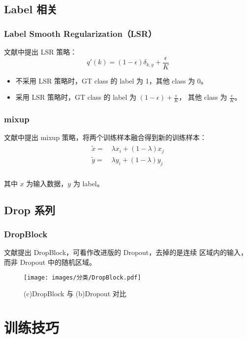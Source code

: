 \subsection{Label 相关}
\subsubsection{Label Smooth Regularization（LSR）}
文献中提出 LSR 策略：
\begin{equation}
  q'(k) = (1-\epsilon) \delta_{k,y} + \frac{\epsilon}{K}
\end{equation}

\begin{itemize}
  \item 不采用 LSR 策略时，GT class 的 label 为 1，其他 class 为 0。
  \item 采用 LSR 策略时，GT class 的 label 为 $(1-\epsilon) + \frac{\epsilon}{K}$，
    其他 class 为 $\frac{\epsilon}{K}$。
\end{itemize}

\subsubsection{mixup}
文献中提出 mixup 策略，将两个训练样本融合得到新的训练样本：
\begin{align}
  \begin{split}
    \tilde{x} = & \, \lambda x_i + (1-\lambda) x_j  \\
    \tilde{y} = & \, \lambda y_i + (1-\lambda) y_j  \\
  \end{split}
\end{align}

其中 $x$ 为输入数据，$y$ 为 label。

\subsection{Drop 系列}
\subsubsection{DropBlock}
文献提出 DropBlock，可看作改进版的 Dropout，去掉的是连续
区域内的输入，而非 Dropout 中的随机区域。

\begin{figure}[ht]
  \centering
  \texttt{[image: images/分类/DropBlock.pdf]}
  \caption{(c)DropBlock 与 (b)Dropout 对比}
  \label{fig:dropblock}
\end{figure}

\section{训练技巧}


